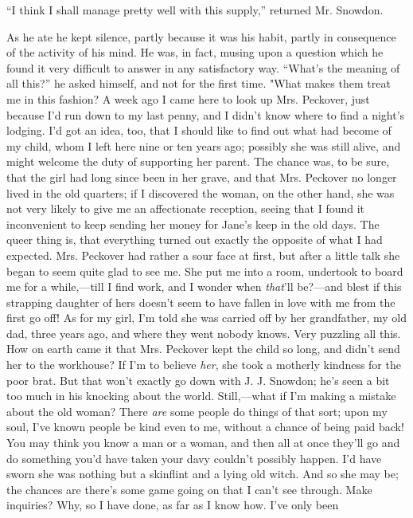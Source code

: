 ``I think I shall manage pretty well with this supply,'' returned Mr.
Snowdon.

As he ate he kept silence, partly because it was his habit, partly in
consequence of the activity of his mind. He was, in fact, musing upon a
question which he found it very difficult to answer in any satisfactory
way. ``What's the meaning of all this?'' he asked himself, and not for
the first time. "What makes them treat me in this fashion? A week ago I
came here to look up Mrs. Peckover, just because I'd run down to my last
penny, and I didn't know where to find a night's lodging. I'd got an
idea, too, that I should like to find out what had become of my child,
whom I left here nine or ten years ago; possibly she was still alive,
and might welcome the duty of supporting her parent. The chance was, to
be sure, that the girl had long since been in her grave, and that Mrs.
Peckover no longer lived in the old quarters; if I discovered the woman,
{\protect\hypertarget{9}{}{}}on the other hand, she was not very likely
to give me an affectionate reception, seeing that I found it
inconvenient to keep sending her money for Jane's keep in the old days.
The queer thing is, that everything turned out exactly the opposite of
what I had expected. Mrs. Peckover had rather a sour face at first, but
after a little talk she began to seem quite glad to see me. She put me
into a room, undertook to board me for a while,---till I find work, and
I wonder when \emph{that}'ll be?---and blest if this strapping daughter
of hers doesn't seem to have fallen in love with me from the first go
off! As for my girl, I'm told she was carried off by her grandfather, my
old dad, three years ago, and where they went nobody knows. Very
puzzling all this. How on earth came it that Mrs. Peckover kept the
child so long, and didn't send her to the workhouse? If I'm to believe
\emph{her}, she took a motherly kindness for the poor brat. But that
won't exactly go down with J. J. Snowdon; he's seen a bit too much in
his knocking about the world. Still,---what if I'm making a mistake
about {\protect\hypertarget{10}{}{}}the old woman? There \emph{are} some
people do things of that sort; upon my soul, I've known people be kind
even to me, without a chance of being paid back! You may think you know
a man or a woman, and then all at once they'll go and do something you'd
have taken your davy couldn't possibly happen. I'd have sworn she was
nothing but a skinflint and a lying old witch. And so she may be; the
chances are there's some game going on that I can't see through. Make
inquiries? Why, so I have done, as far as I know how. I've only been
